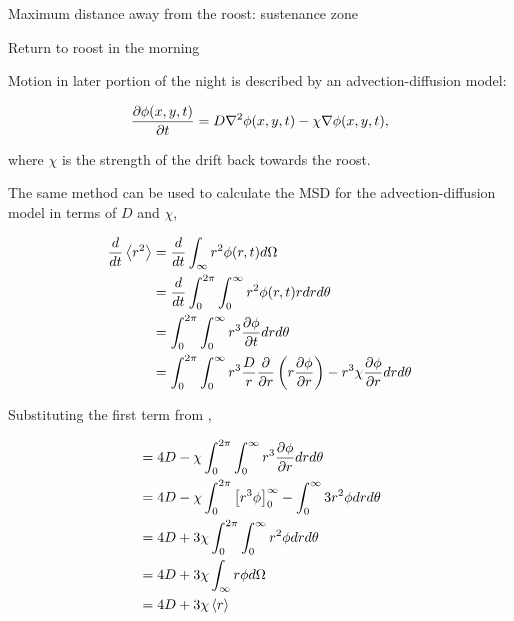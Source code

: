 Maximum distance away from the roost: sustenance zone

Return to roost in the morning

Motion in later portion of the night is described by an advection-diffusion model:

\begin{equation}
  \frac{\partial \phi(x,y,t)}{\partial t} = D \nabla^2 \phi(x,y,t) - \chi \nabla \phi(x,y,t),
  \nonumber
\end{equation}

where $\chi$ is the strength of the drift back towards the roost.

The same method can be used to calculate the MSD for the advection-diffusion model in terms of $D$ and $\chi$,

\begin{equation}
\begin{split}
\frac{d}{dt} \left<r^2\right> &= \frac{d}{dt}\int_{\infty}r^2 \phi(r,t) d\Omega \\
                              &= \frac{d}{dt} \int_0^{2\pi}\int_0^{\infty} r^2 \phi(r,t) r dr d\theta \\
                              &= \int_0^{2\pi} \int_0^{\infty} r^3 \frac{\partial \phi}{\partial t} dr d\theta \\
                              &= \int_0^{2\pi} \int_0^{\infty} r^3 \frac{D}{r} \frac{\partial }{\partial r}\left(r \frac{\partial \phi}{\partial r}\right)- r^3\chi\frac{\partial \phi}{\partial r} dr d\theta \\
\end{split}
\end{equation}


Substituting the first term from ,

\begin{equation}
\begin{split}
                              &= 4D - \chi \int_0^{2\pi} \int_0^{\infty} r^3 \frac{\partial \phi}{\partial r} dr d\theta \\
                              &= 4D - \chi \int_0^{2\pi} \left[ r^3 \phi \right]_0^{\infty} - \int_0^{\infty}  3 r^2 \phi dr d\theta \\
                              &= 4D + 3\chi \int_0^{2\pi} \int_0^{\infty}  r^2 \phi dr d\theta  \\
                              &= 4D + 3\chi \int_{\infty} r \phi d\Omega \\
                              &= 4D + 3\chi \left<r\right>
\nonumber
\end{split}
\end{equation}

